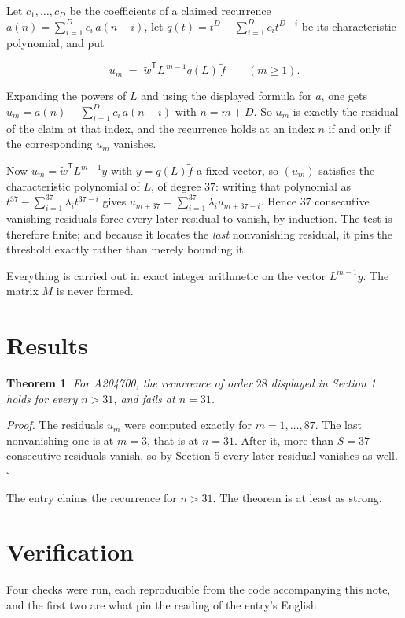 \documentclass[11pt]{article}
\newtheorem{theorem}{Theorem}
\theoremstyle{definition}
\begin{document}
Let $c_1,\dots,c_D$ be the coefficients of a claimed recurrence $a(n) = \sum_{i=1}^{D} c_i\,a(n-i)$, let $q(t) = t^{D} - \sum_{i=1}^{D} c_i t^{D-i}$ be its characteristic polynomial, and put

\[u_m \;=\; \tilde w^{\mathsf T} L^{\,m-1} q(L)\,\tilde f \qquad (m \ge 1).\]

Expanding the powers of $L$ and using the displayed formula for $a$, one gets $u_m = a(n) - \sum_{i=1}^{D} c_i\,a(n-i)$ with $n = m + D$. So $u_m$ is exactly the residual of the claim at that index, and the recurrence holds at an index $n$ if and only if the corresponding $u_m$ vanishes.

Now $u_m = \tilde w^{\mathsf T} L^{m-1} y$ with $y = q(L)\tilde f$ a fixed vector, so $(u_m)$ satisfies the characteristic polynomial of $L$, of degree $37$: writing that polynomial as $t^{37} - \sum_{i=1}^{37} \lambda_i t^{37-i}$ gives $u_{m+37} = \sum_{i=1}^{37} \lambda_i u_{m+37-i}$. Hence $37$ consecutive vanishing residuals force every later residual to vanish, by induction. The test is therefore finite; and because it locates the {\itshape last} nonvanishing residual, it pins the threshold exactly rather than merely bounding it.

Everything is carried out in exact integer arithmetic on the vector $L^{m-1}y$. The matrix $M$ is never formed.

\section{Results}

\begin{theorem} For A204700, the recurrence of order $28$ displayed in Section 1 holds for every $n > 31$, and fails at $n = 31$.\end{theorem}

{\itshape Proof.} The residuals $u_m$ were computed exactly for $m = 1,\dots,87$. The last nonvanishing one is at $m = 3$, that is at $n = 31$. After it, more than $S = 37$ consecutive residuals vanish, so by Section 5 every later residual vanishes as well. $\square$

The entry claims the recurrence for $n > 31$. The theorem is at least as strong.

\section{Verification}

Four checks were run, each reproducible from the code accompanying this note, and the first two are what pin the reading of the entry's English.
\end{document}
